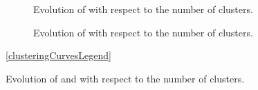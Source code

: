 \begin{figure}[t]
    \centering
    \begin{subfigure}[b]{\textwidth}
        \centering
        \captionsetup{skip=2pt}
        
        \caption{Evolution of \ClusteringUniversalityName with respect to the number of clusters.}
        \label{fig:clustering_universality_curves}
    \end{subfigure}

    \vspace{2em}

    \begin{subfigure}[b]{\textwidth}
        \centering
        \captionsetup{skip=2pt}
        
        \caption{Evolution of \AbstractionScoreName with respect to the number of clusters.}
        \label{fig:abstraction_score_curves}
    \end{subfigure}

    \vspace{1em}
    {\ref{clusteringCurvesLegend}}
    \caption{Evolution of \ClusteringUniversalityName and \AbstractionScoreName with respect to the number of clusters.}
    \label{fig:clustering_curves}
\end{figure}
